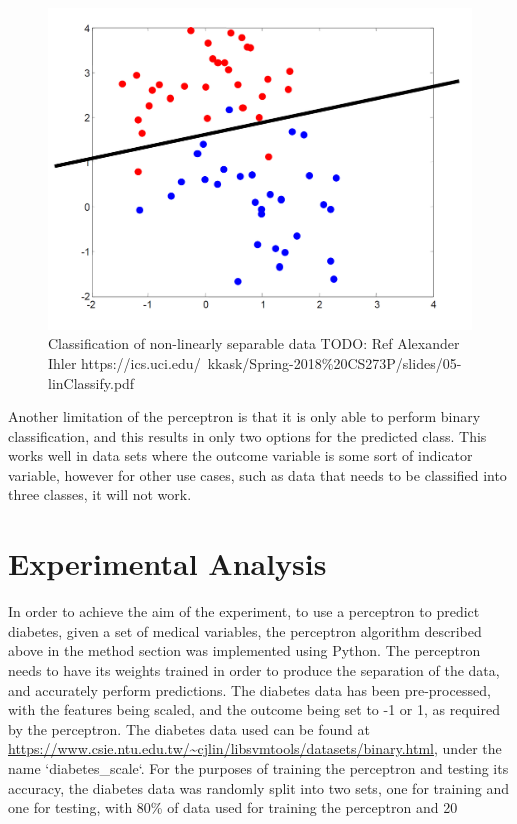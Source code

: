 \documentclass[10pt,twocolumn,a4paper]{article}
\begin{document}
\begin{figure}
    \centering
    \includegraphics[width=1\linewidth]{non-linearly-separable2.png}
    \caption{Classification of non-linearly separable data TODO: Ref Alexander Ihler https://ics.uci.edu/~kkask/Spring-2018\%20CS273P/slides/05-linClassify.pdf }
    \label{fig:non-linearly-separable-2}
\end{figure}

Another limitation of the perceptron is that it is only able to perform binary classification, and this results in only two options for the predicted class. This works well in data sets where the outcome variable is some sort of indicator variable, however for other use cases, such as data that needs to be classified into three classes, it will not work.

\section{Experimental Analysis}

In order to achieve the aim of the experiment, to use a perceptron to predict diabetes, given a set of medical variables, the perceptron algorithm described above in the method section was implemented using Python.  The perceptron needs to have its weights trained in order to produce the separation of the data, and accurately perform predictions. The diabetes data has been pre-processed, with the features being scaled, and the outcome being set to -1 or 1, as required by the perceptron. The diabetes data used can be found at \url{https://www.csie.ntu.edu.tw/~cjlin/libsvmtools/datasets/binary.html}, under the name `diabetes\_scale`. For the purposes of training the perceptron and testing its accuracy, the diabetes data was  randomly split into two sets, one for training and one for testing, with 80\% of data used for training the perceptron and 20%
\end{document}
